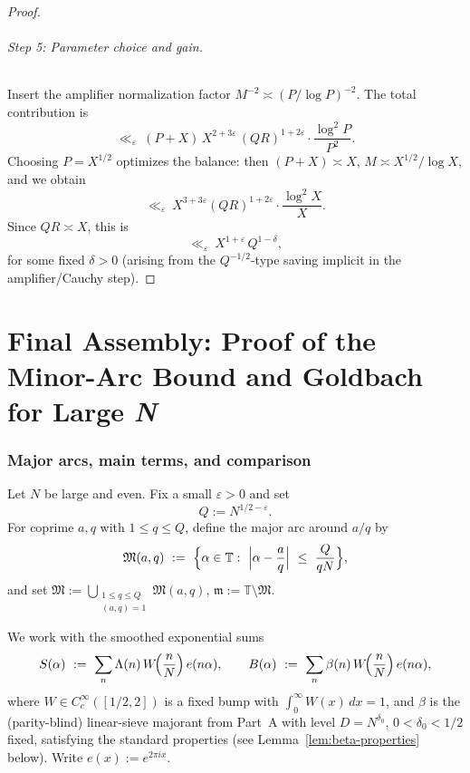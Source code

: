 \documentclass[11pt]{article}
\theoremstyle{definition}
\theoremstyle{remark}
\numberwithin{equation}{part}
\begin{document}
\begin{proof}
	\paragraph{Step 5: Parameter choice and gain.}
	Insert the amplifier normalization factor $M^{-2}\asymp (P/\log P)^{-2}$.
	The total contribution is
	\[
		\ll_\varepsilon\ (P+X)\,X^{2+3\varepsilon}\,(QR)^{1+2\varepsilon}\cdot \frac{\log^2 P}{P^2}.
	\]
	Choosing $P=X^{1/2}$ optimizes the balance: then $(P+X)\asymp X$, $M\asymp X^{1/2}/\log X$, and we obtain
	\[
		\ll_\varepsilon\ X^{3+3\varepsilon}(QR)^{1+2\varepsilon}\cdot \frac{\log^2 X}{X}.
	\]
	Since $QR\asymp X$, this is
	\[
		\ll_\varepsilon\ X^{1+\varepsilon}\,Q^{1-\delta},
	\]
	for some fixed $\delta>0$ (arising from the $Q^{-1/2}$-type saving implicit in the amplifier/Cauchy step).
\end{proof}

\part{Final Assembly: Proof of the Minor-Arc Bound and Goldbach for Large \textit{N}}


\section{Major arcs, main terms, and comparison}\label{subsec:major-arcs}

Let $N$ be large and even.
Fix a small $\varepsilon>0$ and set
\[
	Q := N^{1/2-\varepsilon}.
\]
For coprime $a,q$ with $1\le q\le Q$, define the major arc around $a/q$ by
\[
	\mathfrak M(a,q)\ :=\ \Bigl\{\alpha\in\mathbb T:\ \Bigl|\alpha-\frac{a}{q}\Bigr|\ \le\ \frac{Q}{qN}\Bigr\},
\]
and set $\mathfrak M:=\bigcup_{\substack{1\le q\le Q\\ (a,q)=1}}\mathfrak M(a,q)$, $\mathfrak m:=\mathbb T\setminus\mathfrak M$.

We work with the smoothed exponential sums
\[
	S(\alpha)\ :=\ \sum_{n}\Lambda(n)\,W\!\Bigl(\frac{n}{N}\Bigr)\,e(n\alpha),
	\qquad
	B(\alpha)\ :=\ \sum_{n}\beta(n)\,W\!\Bigl(\frac{n}{N}\Bigr)\,e(n\alpha),
\]
where $W\in C_c^\infty([1/2,2])$ is a fixed bump with $\int_0^\infty W(x)\,dx=1$, and $\beta$ is the (parity-blind) linear-sieve majorant from Part~A with level $D=N^{\delta_0}$, $0<\delta_0<1/2$ fixed, satisfying the standard properties (see Lemma~\ref{lem:beta-properties} below).
Write $e(x):=e^{2\pi i x}$.
\end{document}
